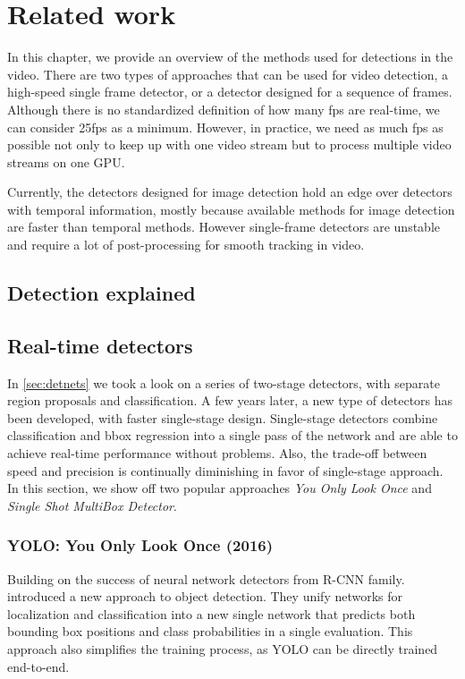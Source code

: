 \chapter{Related work}
\label{chap:related}

In this chapter, we provide an overview of the methods used for detections in the video. There are two types of approaches that can be used for video detection, a high-speed single frame detector, or a detector designed for a sequence of frames. Although there is no standardized definition of how many fps are real-time, we can consider 25fps as a minimum. However, in practice, we need as much fps as possible not only to keep up with one video stream but to process multiple video streams on one GPU. 

Currently, the detectors designed for image detection hold an edge over detectors with temporal information, mostly because available methods for image detection are faster than temporal methods. However single-frame detectors are unstable and require a lot of post-processing for smooth tracking in video. 

\section{Detection explained}

\section{Real-time detectors}
\label{sec:rltm}
In \cref{sec:detnets} we took a look on a series of two-stage detectors, with separate region proposals and classification. A few years later, a new type of detectors has been developed, with faster single-stage design. Single-stage detectors combine classification and bbox regression into a single pass of the network and are able to achieve real-time performance without problems. Also, the trade-off between speed and precision is continually diminishing in favor of single-stage approach. In this section, we show off two popular approaches \textit{You Only Look Once} and \textit{Single Shot MultiBox Detector}.

\subsection{YOLO: You Only Look Once (2016)}
\label{sec:yolo}
Building on the success of neural network detectors from R-CNN family. \citeauthor{bib:yolo} \cite{bib:yolo} introduced a new approach to object detection. They unify networks for localization and classification into a new single network that predicts both bounding box positions and class probabilities in a single evaluation. This approach also simplifies the training process, as YOLO can be directly trained end-to-end. 

